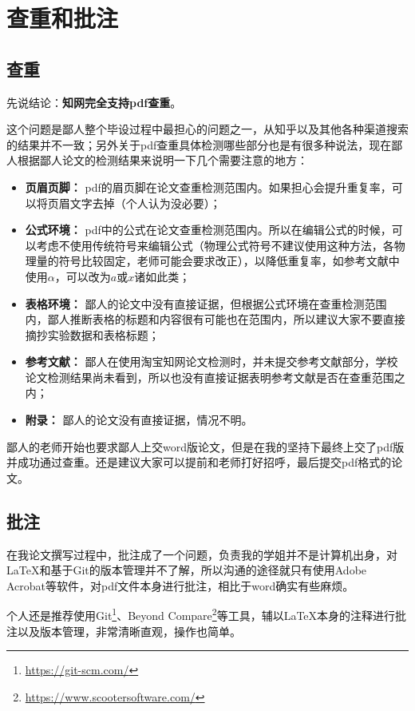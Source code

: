 \chapter{查重和批注}
\section{查重}

先说结论：{\large\textbf{知网完全支持pdf查重}}。

这个问题是鄙人整个毕设过程中最担心的问题之一，从知乎以及其他各种渠道搜索的结果并不一致；另外关于pdf查重具体检测哪些部分也是有很多种说法，现在鄙人根据鄙人论文的检测结果来说明一下几个需要注意的地方：

\begin{itemize}
  \item \textbf{页眉页脚：} pdf的眉页脚在论文查重检测范围内。如果担心会提升重复率，可以将页眉文字去掉（个人认为没必要）；
  \item \textbf{公式环境：} pdf中的公式在论文查重检测范围内。所以在编辑公式的时候，可以考虑不使用传统符号来编辑公式（物理公式符号不建议使用这种方法，各物理量的符号比较固定，老师可能会要求改正），以降低重复率，如参考文献中使用$\alpha$，可以改为$a$或$x$诸如此类；
  \item \textbf{表格环境：} 鄙人的论文中没有直接证据，但根据公式环境在查重检测范围内，鄙人推断表格的标题和内容很有可能也在范围内，所以建议大家不要直接摘抄实验数据和表格标题；
  \item \textbf{参考文献：} 鄙人在使用淘宝知网论文检测时，并未提交参考文献部分，学校论文检测结果尚未看到，所以也没有直接证据表明参考文献是否在查重范围之内；
  \item \textbf{附录：} 鄙人的论文没有直接证据，情况不明。
\end{itemize}

鄙人的老师开始也要求鄙人上交word版论文，但是在我的坚持下最终上交了pdf版并成功通过查重。还是建议大家可以提前和老师打好招呼，最后提交pdf格式的论文。

\section{批注}
在我论文撰写过程中，批注成了一个问题，负责我的学姐并不是计算机出身，对\LaTeX 和基于Git的版本管理并不了解，所以沟通的途径就只有使用Adobe Acrobat等软件，对pdf文件本身进行批注，相比于word确实有些麻烦。

个人还是推荐使用Git\footnote{\url{https://git-scm.com/}}、Beyond Compare\footnote{\url{https://www.scootersoftware.com/}}等工具，辅以\LaTeX 本身的注释进行批注以及版本管理，非常清晰直观，操作也简单。
